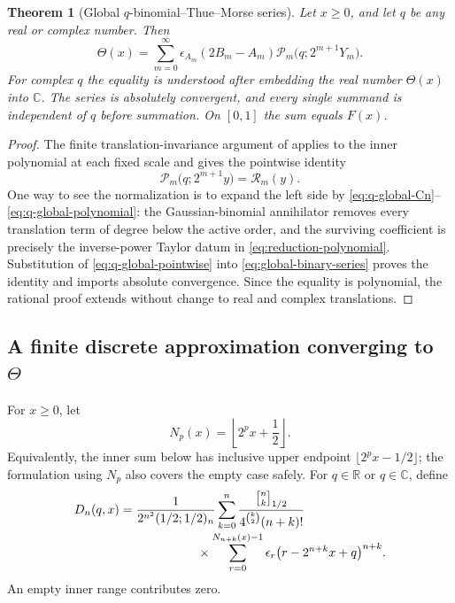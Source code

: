\documentclass[11pt]{article}
\numberwithin{equation}{section}
\newtheorem{theorem}{Theorem}[section]
\theoremstyle{definition}
\theoremstyle{remark}
\newcommand{\R}{\mathbb{R}}
\newcommand{\C}{\mathbb{C}}
\newcommand{\Th}{\Theta}
\begin{document}
\begin{theorem}[Global $q$-binomial--Thue--Morse series]
\label{thm:global-q-series}
Let $x\geq0$, and let $q$ be any real or complex number.  Then
\begin{equation}\label{eq:global-q-series}
 \Th(x)=\sum_{m=0}^{\infty}
 \epsilon_{A_m}(2B_m-A_m)
 \mathcal P_m\bigl(q;2^{m+1}Y_m\bigr).
\end{equation}
For complex $q$ the equality is understood after embedding the real number
$\Th(x)$ into $\C$.  The series is absolutely convergent, and every single
summand is independent of $q$ before summation.  On $[0,1]$ the sum equals
$F(x)$.
\end{theorem}

\begin{proof}
The finite translation-invariance argument of
 applies to the inner polynomial at each fixed scale and
gives the pointwise identity
\begin{equation}\label{eq:q-global-pointwise}
 \mathcal P_m\bigl(q;2^{m+1}y\bigr)=\mathcal R_m(y).
\end{equation}
One way to see the normalization is to expand the left side by
\eqref{eq:q-global-Cn}--\eqref{eq:q-global-polynomial}: the Gaussian-binomial
annihilator removes every translation term of degree below the active order,
and the surviving coefficient is precisely the inverse-power Taylor datum in
\eqref{eq:reduction-polynomial}.  Substitution of
\eqref{eq:q-global-pointwise} into \eqref{eq:global-binary-series} proves the
identity and imports absolute convergence.  Since the equality is polynomial,
the rational proof extends without change to real and complex translations.
\end{proof}

\subsection{A finite discrete approximation converging to \texorpdfstring{$\Th$}{Theta}}

For $x\geq0$, let
\begin{equation}\label{eq:discrete-range}
 N_p(x)=\left\lfloor 2^p x+\frac12\right\rfloor.
\end{equation}
Equivalently, the inner sum below has inclusive upper endpoint
$\lfloor2^p x-1/2\rfloor$; the formulation using $N_p$ also covers the empty
case safely.  For $q\in\R$ or $q\in\C$, define
\begin{align}
 D_n(q,x)
 &=\frac{1}{2^{n^2}(1/2;1/2)_n}
 \sum_{k=0}^{n}
 \frac{\genfrac{[}{]}{0pt}{}{n}{k}_{1/2}}{4^{\binom k2}(n+k)!}
 \notag\\[-2pt]
 &\hspace{22mm}\times
 \sum_{r=0}^{N_{n+k}(x)-1}
 \epsilon_r\bigl(r-2^{n+k}x+q\bigr)^{n+k}.
 \label{eq:discrete-limit-approximation}
\end{align}
An empty inner range contributes zero.
\end{document}
